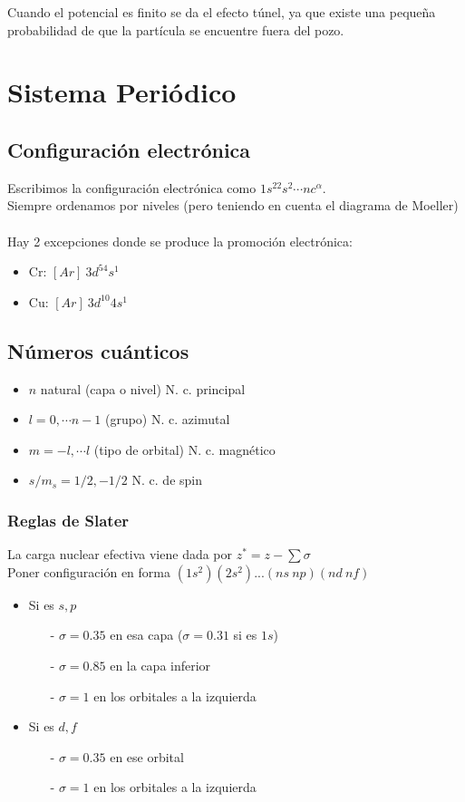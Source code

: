 \documentclass[12pt]{article}
\begin{document}
Cuando el potencial es finito se da el efecto túnel, ya que existe una pequeña probabilidad de que la partícula se encuentre fuera del pozo.		

\newpage	
\section{Sistema Periódico}
\subsection{Configuración electrónica}
Escribimos la configuración electrónica como $1s^22s^2\cdots nc^\alpha$.\\
Siempre ordenamos por niveles (pero teniendo en cuenta el diagrama de Moeller)\\ \\
Hay 2 excepciones donde se produce la promoción electrónica:
\begin{itemize}
	\item Cr: $[Ar]\ 3d^54s^1$
	\item Cu: $[Ar]\ 3d^{10}4s^1$
\end{itemize}

\subsection{Números cuánticos}
\begin{itemize}
	\item $n$ natural (capa o nivel)          N. c. principal
	\item $l = 0,\cdots n-1$ (grupo)          N. c. azimutal
	\item $m = -l, \cdots l$ (tipo de orbital) N. c. magnético
	\item $s/m_s=1/2, -1/2$                   N. c. de spin
\end{itemize}

\subsubsection{Reglas de Slater}
La carga nuclear efectiva viene dada por $z^*=z-\sum\sigma$ \\

Poner configuración en forma $(1s^2)(2s^2)...(ns\ np)(nd\ nf)$
\begin{itemize}
	\item Si es $s,p$
	\begin{itemize}
		\item[-] $\sigma= 0.35$ en esa capa ($\sigma= 0.31$ si es $1s$)
		\item[-] $\sigma= 0.85$ en la capa inferior 
		\item[-] $\sigma=1$ en los orbitales a la izquierda
	\end{itemize}
	\item Si es $d,f$
	\begin{itemize}
		\item[-] $\sigma= 0.35$ en ese orbital
		\item[-] $\sigma=1$ en los orbitales a la izquierda
	\end{itemize}
\end{itemize}
\end{document}
